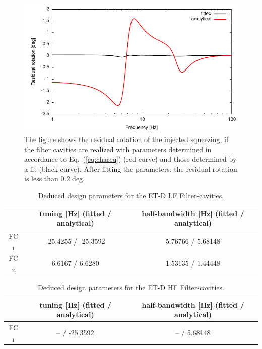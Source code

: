 \begin{figure}
 \centering
   \includegraphics{./Sec_Optics/Fit_realparams.pdf}
   \caption{The figure shows the residual rotation of the injected squeezing, if the filter cavities are realized with parameters determined in accordance to Eq.~(\ref{eq:chareq}) (red curve) and those determined by  a fit (black curve). After fitting the parameters, the residual rotation is less than 0.2 deg.}
   \label{fig:phs-fit-75ppm}
   \end{figure}


{\begin{table}[H]
\centering
\color{\contentcolor}
\begin{tabular}{c|c|c}
\hline
\hline
 & tuning [Hz]  (fitted / analytical) & half-bandwidth [Hz] (fitted / analytical)\\
\hline
FC$_1$ &-25.4255 / -25.3592  & 5.76766 / 5.68148\\
FC$_2$ & 6.6167 / 6.6280  & 1.53135 / 1.44448  \\
\hline
\hline
\end{tabular}
\caption{Deduced design parameters for the ET-D LF Filter-cavities.}
\label{tab:ETDLFfitanaparamsloss}
\end{table}
\begin{table}[H]
\centering
\color{\contentcolor}
\begin{tabular}{c|c|c}
\hline
\hline
 & tuning [Hz]  (fitted / analytical) & half-bandwidth [Hz] (fitted / analytical)\\
\hline
FC$_1$ &-- / -25.3592  & -- / 5.68148\\
\hline
\hline
\end{tabular}
\caption{Deduced design parameters for the ET-D HF Filter-cavities.}
\end{table}
}

